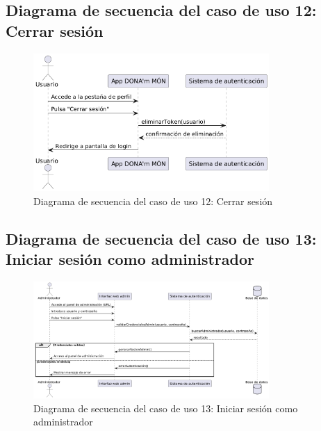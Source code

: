 \subsection{Diagrama de secuencia del caso de uso 12: Cerrar sesión}
\begin{figure}[H]
    \centering
    \includegraphics[width=0.8\textwidth]{figs/caso12.png}
    \caption{Diagrama de secuencia del caso de uso 12: Cerrar sesión}
\end{figure}

\subsection{Diagrama de secuencia del caso de uso 13: Iniciar sesión como administrador}
\begin{figure}[H]
    \centering
    \includegraphics[width=0.8\textwidth]{figs/caso13.png}
    \caption{Diagrama de secuencia del caso de uso 13: Iniciar sesión como administrador}
\end{figure}

